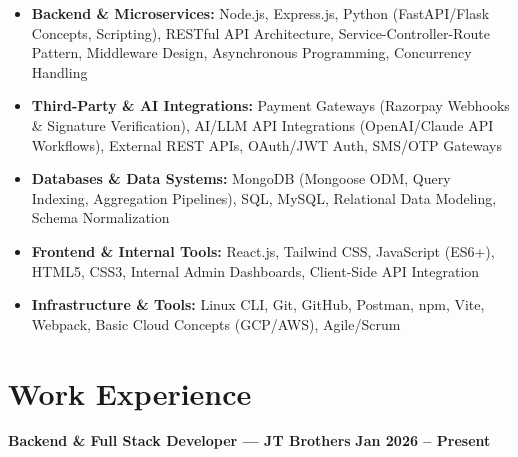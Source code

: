 \documentclass[a4paper,10pt]{article}
\begin{document}
\begin{itemize}

    \item \textbf{Backend \& Microservices:}
    Node.js, Express.js, Python (FastAPI/Flask Concepts, Scripting),
    RESTful API Architecture, Service-Controller-Route Pattern,
    Middleware Design, Asynchronous Programming, Concurrency Handling

    \item \textbf{Third-Party \& AI Integrations:}
    Payment Gateways (Razorpay Webhooks \& Signature Verification),
    AI/LLM API Integrations (OpenAI/Claude API Workflows),
    External REST APIs, OAuth/JWT Auth, SMS/OTP Gateways

    \item \textbf{Databases \& Data Systems:}
    MongoDB (Mongoose ODM, Query Indexing, Aggregation Pipelines),
    SQL, MySQL, Relational Data Modeling, Schema Normalization

    \item \textbf{Frontend \& Internal Tools:}
    React.js, Tailwind CSS, JavaScript (ES6+), HTML5, CSS3,
    Internal Admin Dashboards, Client-Side API Integration

    \item \textbf{Infrastructure \& Tools:}
    Linux CLI, Git, GitHub, Postman, npm, Vite, Webpack,
    Basic Cloud Concepts (GCP/AWS), Agile/Scrum

\end{itemize}

\section*{Work Experience}

\textbf{Backend \& Full Stack Developer --- JT Brothers}
\hfill
\textbf{Jan 2026 -- Present}
\end{document}
